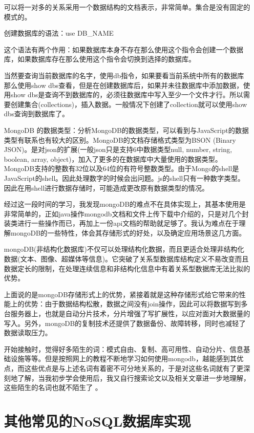 \documentclass[11pt, a4paper, oneside]{ctexart}
\begin{document}
可以将一对多的关系采用一个数据结构的文档表示，非常简单。集合是没有固定的模式的。

创建数据库的语法：use DB\_NAME

这个语法有两个作用：如果数据库本身不存在那么使用这个指令会创建一个数据库，如果数据库存在那么使用这个指令会切换到选择的数据库。

当然要查询当前数据库的名字，使用db指令，如果要看当前系统中所有的数据库那么使用show dbs查看，但是在创建数据库后，如果并未往数据库中添加数据，使用show dbs是查询不到数据库的，必须往数据库中写入至少一个文件才行。所以需要创建集合(collections)，插入数据。一般情况下创建了collection就可以使用show dbs查询到数据库了。

MongoDB 的数据类型：分析MongoDB的数据类型，可以看到与JavaScript的数据类型有联系也有较大的区别。MongoDB的文档存储格式类型为BSON (Binary JSON)。是对json的扩展(一般json只是支持6中数据类型null, number, string, boolean, array, object)，加入了更多的在数据库中大量使用的数据类型。MongoDB支持的整数有32位以及64位的有符号整数类型。由于Mongo的shell是JavaScript的shell。因此处理数字的时候会出问题。js的shell只有一种数字类型。因此在用shell进行数据存储时，可能造成更改原有数据类型的情况。
    
经过这一段时间的学习，我发现mongoDB的难点不在具体实现上，其基本使用是非常简单的，正如java操作mongodb文档和文件上传下载中介绍的，只是对几个封装类进行一些操作而已，再加上一份api文档的帮助就足够了。我认为难点在于理解mongoDB的一些特性，体会其存储形式的好处，以及确定应用场景这几方面。 

mongoDB(非结构化数据库)不仅可以处理结构化数据，而且更适合处理非结构化数据(文本、图像、超媒体等信息)。它突破了关系型数据库结构定义不易改变而且数据定长的限制，在处理连续信息和非结构化信息中有着关系型数据库无法比拟的优势。

上面说的是mongoDB存储形式上的优势，紧接着就是这种存储形式给它带来的性能上的优势：由于数据结构松散，数据之间没有join操作，因此可以将数据写到多台服务器上，也就是自动分片技术，分片增强了写扩展性，以应对面对大数据量的写入。另外，mongoDB的复制技术还提供了数据备份、故障转移，同时也减轻了数据读取压力。

 开始接触时，觉得好多陌生的词：模式自由、复制、高可用性、自动分片、信息基础设施等等。但是按照网上的教程不断地学习如何使用mongodb，越能感到其优点，而这些优点是与上述名词有着密不可分地关系的，于是对这些名词就有了更深刻地了解，当我初步学会使用后，我又自行搜索论文以及相关文章进一步地理解，这些陌生的名词也就不陌生了 。

\section{其他常见的NoSQL数据库实现}
\end{document}
